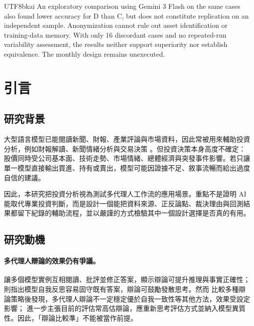 \documentclass[12pt,a4paper]{article}
\begin{document}
\begin{CJK}{UTF8}{bkai}
\noindent An exploratory comparison using Gemini 3 Flash on the same cases also found lower accuracy for D than C, but does not constitute replication on an independent sample. Anonymization cannot rule out asset identification or training-data memory. With only 16 discordant cases and no repeated-run variability assessment, the results neither support superiority nor establish equivalence. The monthly design remains unexecuted.

\clearpage
{}

\section{引言}
\label{sec:motivation}

\subsection{研究背景}

大型語言模型已能閱讀新聞、財報、產業評論與市場資料，因此常被用來輔助投資分析，例如財報解讀、新聞情緒分析與交易決策 \citep{lopezlira2023chatgpt,araci2019finbert,liu2023fingpt}。但投資決策本身高度不確定：股價同時受公司基本面、技術走勢、市場情緒、總體經濟與突發事件影響。若只讓單一模型直接輸出買進、持有或賣出，模型可能因證據不足、敘事流暢而給出過度自信的建議。

因此，本研究把投資分析視為測試多代理人工作流的應用場景。重點不是證明 AI 能取代專業投資判斷，而是設計一個能把資料來源、正反論點、裁決理由與回測結果都留下紀錄的輔助流程，並以嚴謹的方式檢驗其中一個設計選擇是否真的有用。

\subsection{研究動機}

\paragraph{多代理人辯論的效果仍有爭議。}
\citet{du2023debate} 讓多個模型實例互相閱讀、批評並修正答案，顯示辯論可提升推理與事實正確性；\citet{liang2023divergent} 則指出模型自我反思容易固守既有答案，辯論可鼓勵發散思考。然而 \citet{smit2023mad} 比較多種辯論策略後發現，多代理人辯論不一定穩定優於自我一致性等其他方法，效果受設定影響；\citet{zhang2025stop} 進一步主張目前的評估常高估辯論，應重新思考評估方式並納入模型異質性。因此，「辯論比較準」不能被當作前提。


\end{CJK}
\end{document}
